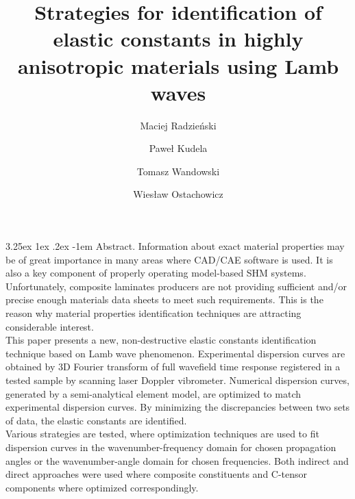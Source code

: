 \documentclass[runningheads]{llncs}
\makeatletter
\renewcommand\paragraph{\@startsection{paragraph}{4}{\z@}%
                                    {3.25ex \@plus1ex \@minus.2ex}%
                                    {-1em}%
                                    {\normalfont\normalsize\bfseries}}
\makeatother
\begin{document}
%
\title{Strategies for identification of elastic constants in highly anisotropic materials using Lamb waves}
%
%
\author{Maciej Radzieński \and
Paweł Kudela  \and 
Tomasz Wandowski 
\and Wiesław Ostachowicz
}
%
%
%
\maketitle              %
%
\paragraph{Abstract.}
Information about exact material properties may be of great importance in many areas where CAD/CAE software is used. It is also a key component of properly operating model-based SHM systems. Unfortunately, composite laminates producers are not providing sufficient and/or precise enough materials data sheets to meet such requirements. This is the reason why material properties identification techniques are attracting considerable interest.
\\
This paper presents a new, non-destructive elastic constants identification technique based on Lamb wave phenomenon. Experimental dispersion curves are obtained by 3D Fourier transform of full wavefield time response registered in a tested sample by scanning laser Doppler vibrometer. Numerical dispersion curves, generated by a semi-analytical element model, are optimized to match experimental dispersion curves. By minimizing the discrepancies between two sets of data, the elastic constants are identified. 
\\
Various strategies are tested, where optimization techniques are used to fit dispersion curves in the wavenumber-frequency domain for chosen propagation angles or the wavenumber-angle domain for chosen frequencies. Both indirect and direct approaches were used where composite constituents and C-tensor components where optimized correspondingly.




%
\\[2em]
\end{document}
